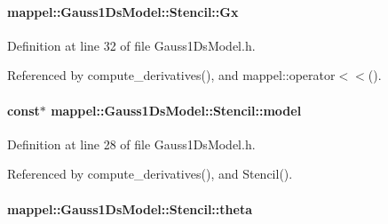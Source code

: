 \paragraph[{\texorpdfstring{Gx}{Gx}}]{ mappel\+::\+Gauss1\+Ds\+Model\+::\+Stencil\+::\+Gx}\hypertarget{classmappel_1_1Gauss1DsModel_1_1Stencil_af1658c447b8050ad4c1c764ec7d8d552}{}\label{classmappel_1_1Gauss1DsModel_1_1Stencil_af1658c447b8050ad4c1c764ec7d8d552}


Definition at line 32 of file Gauss1\+Ds\+Model.\+h.



Referenced by compute\+\_\+derivatives(), and mappel\+::operator$<$$<$().

\paragraph[{\texorpdfstring{model}{model}}]{ const$\ast$ mappel\+::\+Gauss1\+Ds\+Model\+::\+Stencil\+::model}\hypertarget{classmappel_1_1Gauss1DsModel_1_1Stencil_aea5b9e51d1fc6471820598c321472bfe}{}\label{classmappel_1_1Gauss1DsModel_1_1Stencil_aea5b9e51d1fc6471820598c321472bfe}


Definition at line 28 of file Gauss1\+Ds\+Model.\+h.



Referenced by compute\+\_\+derivatives(), and Stencil().

\paragraph[{\texorpdfstring{theta}{theta}}]{ mappel\+::\+Gauss1\+Ds\+Model\+::\+Stencil\+::theta}\hypertarget{classmappel_1_1Gauss1DsModel_1_1Stencil_ab1acb6728b521c0ba62d06bc9a92ae79}{}\label{classmappel_1_1Gauss1DsModel_1_1Stencil_ab1acb6728b521c0ba62d06bc9a92ae79}


